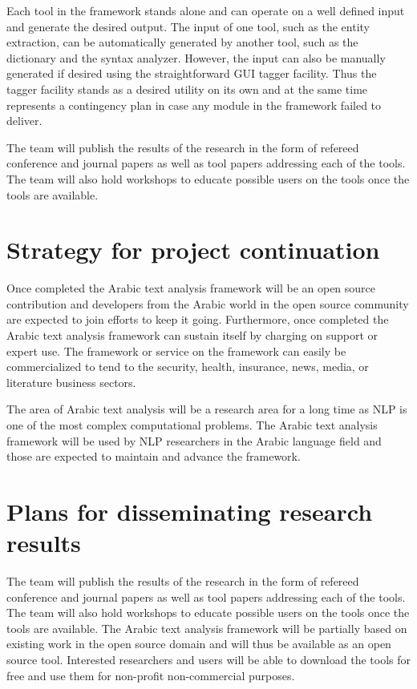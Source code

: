\documentclass[12pt]{article}
\begin{document}
Each tool in the framework stands alone and can operate on a well defined input and generate the desired output.
 The input of one tool, such as the entity extraction, can be automatically generated by another tool, such as the dictionary and the syntax analyzer.
  However, the input can also be manually generated if desired using the straightforward GUI tagger facility.
 Thus the tagger facility stands as a desired utility on its own and at the same time represents a contingency plan in case any module in the framework failed to deliver.
 
The team will publish the results of the research in the form of refereed conference and journal papers as well as tool papers addressing each of the tools.
 The team will also hold workshops to educate possible users on the tools once the tools are available.



\section{Strategy for project continuation}
\label{s:continue}


Once completed the Arabic text analysis framework will be an open source contribution and developers from the Arabic world in the open source community are expected to join efforts to keep it going.
 Furthermore, once completed the Arabic text analysis framework can sustain itself by charging on support or expert use.
 The framework or service on the framework can easily be commercialized to tend to the security, health, insurance, news, media, or literature business sectors.
 
The area of Arabic text analysis will be a research area for a long time as NLP is one of the most complex computational problems.
 The Arabic text analysis framework will be used by NLP researchers in the Arabic language field and those are expected to maintain and advance the framework.




\section{Plans for disseminating research results}
\label{s:dissem}

The team will publish the results of the research in the form 
of refereed conference and journal papers as well as tool papers 
addressing each of the tools. 
The team will also hold workshops to educate possible users on the 
tools once the tools are available.
The Arabic text analysis framework will be partially based on 
existing work in the open source domain and will thus be available 
as an open source tool. 
Interested researchers and users will be able to download the tools 
for free and use them for non-profit non-commercial purposes.  

\pagebreak
%
%

%
{\small
  
}
\end{document}
